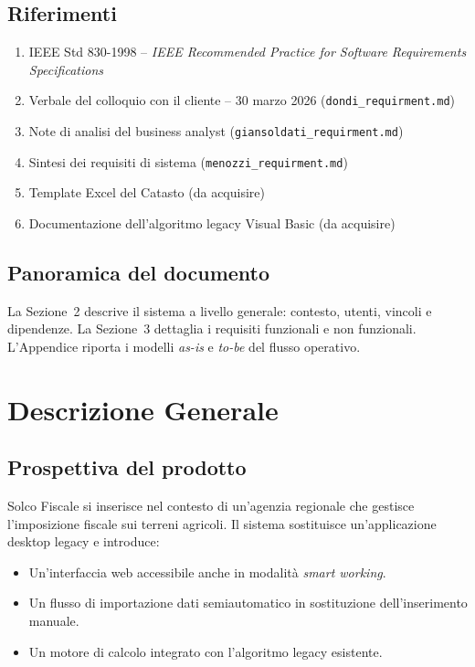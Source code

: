 \documentclass[12pt, a4paper]{article}
\begin{document}
\subsection{Riferimenti}

\begin{enumerate}
  \item IEEE Std 830-1998 -- \textit{IEEE Recommended Practice for Software Requirements Specifications}
  \item Verbale del colloquio con il cliente -- 30 marzo 2026 (\texttt{dondi\_requirment.md})
  \item Note di analisi del business analyst (\texttt{giansoldati\_requirment.md})
  \item Sintesi dei requisiti di sistema (\texttt{menozzi\_requirment.md})
  \item Template Excel del Catasto (da acquisire)
  \item Documentazione dell'algoritmo legacy Visual Basic (da acquisire)
\end{enumerate}

\subsection{Panoramica del documento}

La Sezione~2 descrive il sistema a livello generale: contesto, utenti, vincoli e dipendenze.
La Sezione~3 dettaglia i requisiti funzionali e non funzionali.
L'Appendice riporta i modelli \textit{as-is} e \textit{to-be} del flusso operativo.

\section{Descrizione Generale}

\subsection{Prospettiva del prodotto}

Solco Fiscale si inserisce nel contesto di un'agenzia regionale che gestisce l'imposizione
fiscale sui terreni agricoli. Il sistema sostituisce un'applicazione desktop legacy e introduce:
\begin{itemize}
  \item Un'interfaccia web accessibile anche in modalità \textit{smart working}.
  \item Un flusso di importazione dati semiautomatico in sostituzione dell'inserimento manuale.
  \item Un motore di calcolo integrato con l'algoritmo legacy esistente.
\end{itemize}
\end{document}
